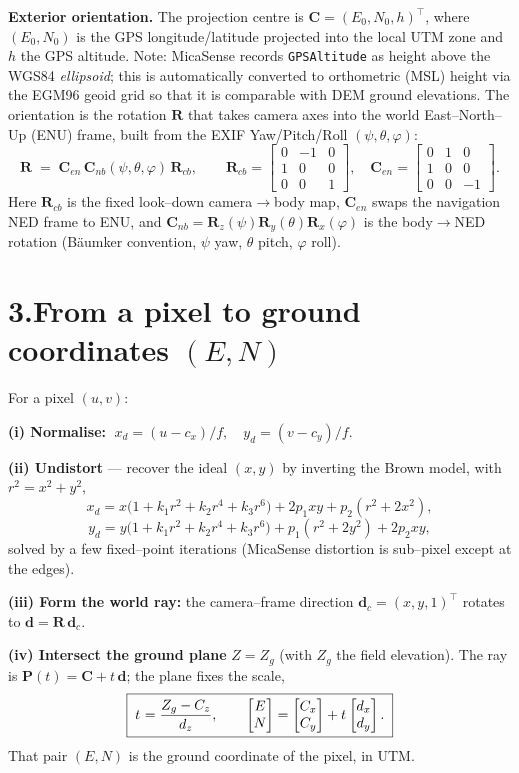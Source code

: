 \documentclass[10pt]{article}
\newcommand{\R}{\mathbf{R}}
\newcommand{\vd}{\mathbf{d}}
\newcommand{\vC}{\mathbf{C}}
\begin{document}
\noindent\textbf{Exterior orientation.} The projection centre is $\vC=(E_0,N_0,h)^{\!\top}$, where $(E_0,N_0)$ is the GPS longitude/latitude projected into the local UTM zone and $h$ the GPS altitude. Note: MicaSense records \texttt{GPSAltitude} as height above the WGS84 \emph{ellipsoid}; this is automatically converted to orthometric (MSL) height via the EGM96 geoid grid so that it is comparable with DEM ground elevations. The orientation is the rotation $\R$ that takes camera axes into the world East--North--Up (ENU) frame, built from the EXIF Yaw/Pitch/Roll $(\psi,\theta,\varphi)$:
\[
\R \;=\; \mathbf{C}_{en}\,\mathbf{C}_{nb}(\psi,\theta,\varphi)\,\mathbf{R}_{cb},
\qquad
\mathbf{R}_{cb}=\!\begin{bmatrix}0&-1&0\\1&0&0\\0&0&1\end{bmatrix}\!,\quad
\mathbf{C}_{en}=\!\begin{bmatrix}0&1&0\\1&0&0\\0&0&-1\end{bmatrix}\!.
\]
Here $\mathbf{R}_{cb}$ is the fixed look--down camera$\to$body map, $\mathbf{C}_{en}$ swaps the navigation NED frame to ENU, and $\mathbf{C}_{nb}=\mathbf{R}_z(\psi)\mathbf{R}_y(\theta)\mathbf{R}_x(\varphi)$ is the body$\to$NED rotation (B\"aumker convention, $\psi$ yaw, $\theta$ pitch, $\varphi$ roll).

\section*{3.\quad From a pixel to ground coordinates $(E,N)$}
For a pixel $(u,v)$:

\textbf{(i) Normalise:} $\;x_d=(u-c_x)/f,\quad y_d=(v-c_y)/f.$

\textbf{(ii) Undistort} --- recover the ideal $(x,y)$ by inverting the Brown model, with $r^2=x^2+y^2$,
\[
x_d = x\bigl(1+k_1r^2+k_2r^4+k_3r^6\bigr)+2p_1xy+p_2(r^2+2x^2),
\]
\[
y_d = y\bigl(1+k_1r^2+k_2r^4+k_3r^6\bigr)+p_1(r^2+2y^2)+2p_2xy,
\]
solved by a few fixed--point iterations (MicaSense distortion is sub--pixel except at the edges).

\textbf{(iii) Form the world ray:} the camera--frame direction $\vd_c=(x,y,1)^{\!\top}$ rotates to $\vd=\R\,\vd_c$.

\textbf{(iv) Intersect the ground plane} $Z=Z_g$ (with $Z_g$ the field elevation). The ray is $\mathbf{P}(t)=\vC+t\,\vd$; the plane fixes the scale,
\[
\boxed{\;t^{\*}=\dfrac{Z_g-C_z}{d_z},\qquad
\begin{bmatrix}E\\N\end{bmatrix}=
\begin{bmatrix}C_x\\C_y\end{bmatrix}+t^{\*}\begin{bmatrix}d_x\\d_y\end{bmatrix}.\;}
\]
That pair $(E,N)$ is the ground coordinate of the pixel, in UTM.
\end{document}
